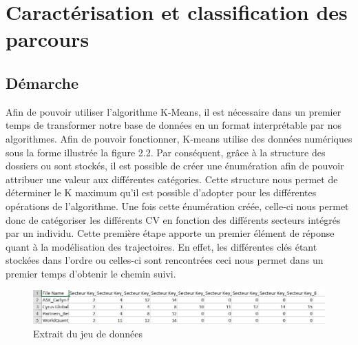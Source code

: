 \documentclass[memoire.tex]{subfiles}
\begin{document}
\section{Caractérisation et classification des parcours}
\subsection{Démarche}
Afin de pouvoir utiliser l'algorithme K-Means, il est nécessaire dans un premier temps de transformer notre base de données en un format interprétable par nos algorithmes. Afin de pouvoir fonctionner, K-means utilise des données numériques sous la forme illustrée la figure 2.2. Par conséquent, grâce à la structure des dossiers ou sont stockés, il est possible de créer une énumération afin de pouvoir attribuer une valeur aux différentes catégories. Cette structure nous permet de déterminer le K maximum qu’il est possible d’adopter pour les différentes opérations de l’algorithme. Une fois cette énumération créée, celle-ci nous permet donc de catégoriser les différents CV en fonction des différents secteurs intégrés par un individu. Cette première étape apporte un premier élément de réponse quant à la modélisation des trajectoires. En effet, les différentes clés étant stockées dans l'ordre ou celles-ci sont rencontrées ceci nous permet dans un premier temps d'obtenir le chemin suivi.
	\begin{figure}[h!]
		\centerline{\includegraphics[scale=0.7]{img/data_sample.png}}
		\caption{Extrait du jeu de données}
	\end{figure}
\end{document}
